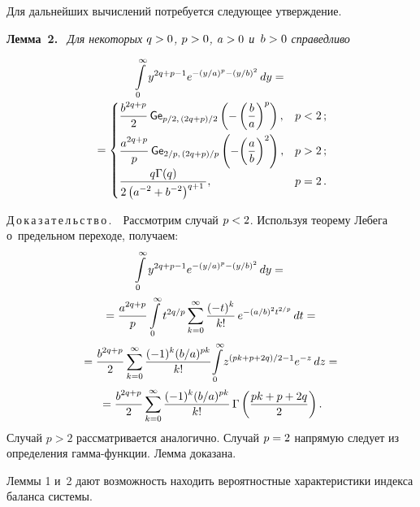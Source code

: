 \begin{multicols}{2}
Для дальнейших вычислений потребуется следующее утверждение.

\vspace*{2pt}

\noindent
\textbf{Лемма~2.}\
\textit{Для некоторых $q\hm>0$, $p\hm>0$, $a\hm>0$ и~$b\hm>0$ справедливо}

\noindent
\begin{multline*}
\int\limits_0^{\infty}y^{2q+p-1}e^{-(y/a)^p-(y/b)^2} \,dy ={}\\[-1pt]
{}=
 \begin{cases}
   \displaystyle\displaystyle\frac{\displaystyle b^{2q+p}\mathstrut}{\displaystyle 2\mathstrut} \,{\sf Ge}_{p/2,\, (2q+p)/2} \left(-
\left(\displaystyle\frac{\displaystyle b\mathstrut}{\displaystyle a\mathstrut}\right)^p\right), &p<2\,;\\[9pt]
   \displaystyle\displaystyle\frac{\displaystyle a^{2q+p}\mathstrut}{\displaystyle p\mathstrut}\,{\sf Ge}_{2/p,\, (2q+p)/p} \left(-
{\left(\displaystyle\frac{\displaystyle a\mathstrut}{\displaystyle b\mathstrut}\right)^{2}}\right), &p > 2\,;\\[3pt]
   \displaystyle\displaystyle\frac{\displaystyle q \Gamma(q)\mathstrut}{\displaystyle 2\left(a^{-2}+b^{-2}\right)^{q +1}\mathstrut}, &p = 2\,.
 \end{cases}
\end{multline*}


\noindent
Д\,о\,к\,а\,з\,а\,т\,е\,л\,ь\,с\,т\,в\,о\,.\ \
Рассмотрим случай $p\hm<2$. Используя теорему Лебега о~предельном переходе, 
получаем:
\begin{multline*}
\int\limits_0^{\infty}y^{2q+p-1}e^{-(y/a)^p-(y/b)^2} \, dy ={}\\[1pt]
{}=
\displaystyle\frac{\displaystyle a^{2q+p}\mathstrut}{\displaystyle p\mathstrut} \int\limits_0^{\infty} t^{2q/p}\sum\limits_{k=0}^\infty 
\displaystyle\frac{\displaystyle (-t)^k\mathstrut}{\displaystyle k!\mathstrut}\, e^{-(a/b)^2t^{2/p}} \, dt={}\\[1pt]
{}= \displaystyle\frac{\displaystyle b^{2q+p}\mathstrut}{\displaystyle 2\mathstrut} \sum\limits_{k=0}^\infty \displaystyle\frac{\displaystyle (-1)^k (b/a)^{pk}\mathstrut}{\displaystyle k!\mathstrut} 
\!\int\limits_0^{\infty}\! z^{(pk+p+2q)/2 - 1} e^{-z} \, dz ={}\\[1pt]
{}=\displaystyle\frac{\displaystyle b^{2q+p}\mathstrut}{\displaystyle 2\mathstrut} \sum\limits_{k=0}^\infty \displaystyle\frac{\displaystyle (-1)^k (b/a)^{pk}\mathstrut}{\displaystyle k!\mathstrut}\, 
\Gamma\left(\displaystyle\frac{\displaystyle pk+p+2q\mathstrut}{\displaystyle 2\mathstrut}\right).
\end{multline*}
Случай $p>2$ рассматривается аналогично. Случай $p\hm=2$ напрямую следует из 
определения гам\-ма-функ\-ции.
Лемма доказана.

\smallskip

Леммы 1 и~2 дают возможность находить вероятностные характеристики индекса 
баланса системы.

\smallskip


\end{multicols}
